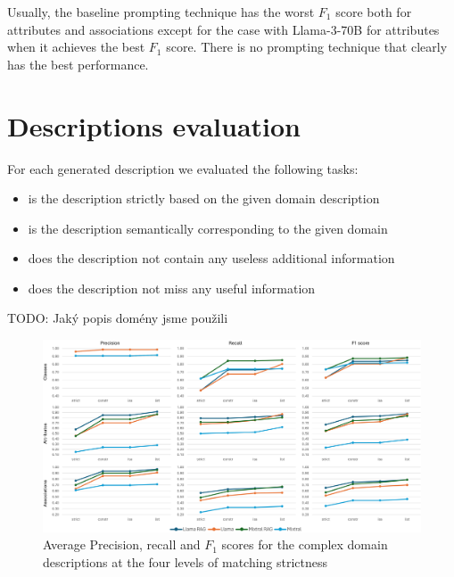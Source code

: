 Usually, the baseline prompting technique has the worst $F_1$ score both for attributes and associations except for the case with Llama-3-70B for attributes when it achieves the best $F_1$ score. There is no prompting technique that clearly has the best performance.


\section{Descriptions evaluation}

For each generated description we evaluated the following tasks:
\begin{itemize}
\item is the description strictly based on the given domain description
\item is the description semantically corresponding to the given domain
\item does the description not contain any useless additional information
\item does the description not miss any useful information \\
\end{itemize}

\noindent{}TODO: Jaký popis domény jsme použili

\begin{figure}[!h]
    \centering
    \includegraphics[scale=0.10]{img/evaluation-complex-p-r-f1.png}
    \caption{\centering Average Precision, recall and $F_1$ scores for the complex domain descriptions at the four levels of matching strictness}
    \label{fig:evaluation-complex-p-r-f1}
\end{figure}

